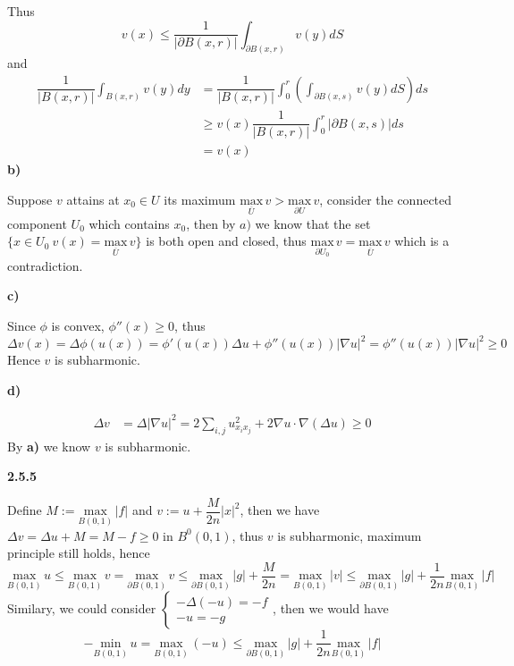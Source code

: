 \documentclass[12pt]{article}
\begin{document}
Thus 
\[
v(x)\leq\dfrac{1}{|\partial B(x,r)|}\int_{\partial B(x,r)}v(y)dS
\]
and
\[
\begin{aligned}
\dfrac{1}{|B(x,r)|}\int_{B(x,r)}v(y)dy
&= \dfrac{1}{|B(x,r)|}\int_{0}^{r}\left(\int_{\partial B(x,s)}v(y)dS\right)ds \\
&\geq v(x)\dfrac{1}{|B(x,r)|}\int_{0}^{r}|\partial B(x,s)|ds \\
&=v(x)
\end{aligned}
\]
\textbf{b)}\par
Suppose $v$ attains at $x_{0}\in U$ its maximum $\underset{\overline{U}}{\mathrm{max}}\,v > \underset{\partial U}{\mathrm{max}}\,v$, consider the connected component $U_{0}$ which contains $x_{0}$,  then by $a)$ we know that the set $\{x\in U_{0}\:v(x)=\underset{\overline{U}}{\mathrm{max}}\,v\}$ is both open and closed, thus $\underset{\partial U_{0}}{\mathrm{max}}\,v=\underset{\overline{U}}{\mathrm{max}}\,v$ which is a contradiction. \par
\textbf{c)}\par
Since $\phi$ is convex, $\phi''(x)\geq 0$, thus
\[
\Delta v(x)=\Delta\phi(u(x))=\phi'(u(x))\Delta u+\phi''(u(x))|\nabla u|^{2}=\phi''(u(x))|\nabla u|^{2}\geq 0
\]
Hence $v$ is subharmonic. \par
\textbf{d)}\par
\[
\begin{aligned}
\Delta v &= \Delta |\nabla u|^{2} =2\sum_{i,j}u_{x_{i}x_{j}}^{2}+2\nabla u\cdot\nabla(\Delta u)\geq 0
\end{aligned}
\]
By \textbf{a)} we know $v$ is subharmonic. \par
\textbf{2.5.5} \par
Define $M:=\underset{B(0,1)}{\mathrm{max}}\,|f|$ and $v:=u+\dfrac{M}{2n}|x|^{2}$, then we have $\Delta v=\Delta u+M=M-f\geq 0$ in $B^{0}(0,1)$, thus $v$ is subharmonic, maximum principle still holds, hence \[
\underset{B(0,1)}{\mathrm{max}}\,u \leq\underset{B(0,1)}{\mathrm{max}}\,v=\underset{\partial B(0,1)}{\mathrm{max}}\,v\leq \underset{\partial B(0,1)}{\mathrm{max}}\,|g|+\dfrac{M}{2n}=\underset{B(0,1)}{\mathrm{max}}\,|v|\leq \underset{\partial B(0,1)}{\mathrm{max}}\,|g|+\dfrac{1}{2n}\underset{B(0,1)}{\mathrm{max}}\,|f|
\]Similary, we could consider $\left\{\begin{matrix}
-\Delta(-u)=-f\\ 
-u=-g
\end{matrix}\right.$, then we would have $$-\underset{B(0,1)}{\mathrm{min}}\,u=\underset{B(0,1)}{\mathrm{max}}\,(-u)\leq\underset{\partial B(0,1)}{\mathrm{max}}\,|g|+\dfrac{1}{2n}\underset{B(0,1)}{\mathrm{max}}\,|f| $$
\end{document}
